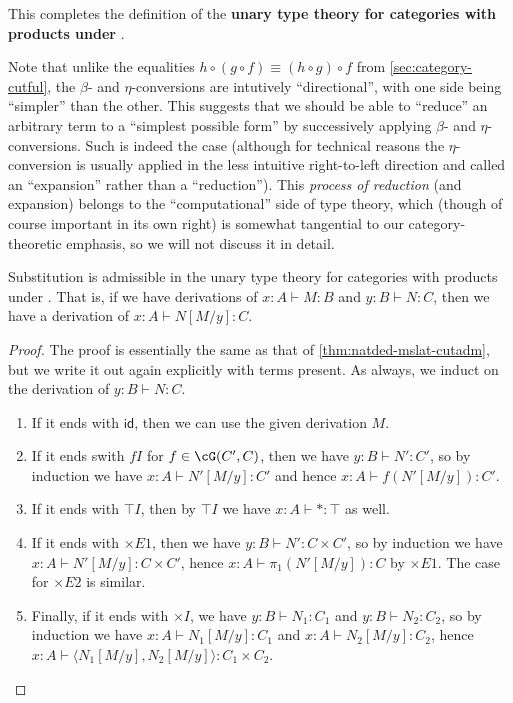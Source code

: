 \documentclass{book}
\def\idfunc{\mathsf{id}}
\let\types\vdash
\def\unit{\top}%
\def\ttt{\mathord{\ast}}%
\def\timesE{\ensuremath{\mathord{\times}E}}
\def\timesI{\ensuremath{\mathord{\times}I}}
\def\pair#1#2{\langle #1,#2\rangle}
\begin{document}
This completes the definition of the \textbf{unary type theory for categories with products under \cG}.

\begin{rmk}\label{rmk:beta-reduction}
  Note that unlike the equalities $h\circ (g\circ f) \equiv (h\circ g)\circ f$ from \cref{sec:category-cutful}, the $\beta$- and $\eta$-conversions are intutively ``directional'', with one side being ``simpler'' than the other.
  This suggests that we should be able to ``reduce'' an arbitrary term to a ``simplest possible form'' by successively applying $\beta$- and $\eta$-conversions.
  Such is indeed the case (although for technical reasons the $\eta$-conversion is usually applied in the less intuitive right-to-left direction and called an ``expansion'' rather than a ``reduction'').
  This \emph{process of reduction} (and expansion) belongs to the ``computational'' side of type theory, which (though of course important in its own right) is somewhat tangential to our category-theoretic emphasis, so we will not discuss it in detail.
\end{rmk}

\begin{thm}\label{thm:catprod-subadm}
  Substitution is admissible in the unary type theory for categories with products under \cG.
  That is, if we have derivations of $x:A\types M:B$ and $y:B \types N:C$, then we have a derivation of $x:A \types N[M/y]:C$.
\end{thm}
\begin{proof}
  The proof is essentially the same as that of \cref{thm:natded-mslat-cutadm}, but we write it out again explicitly with terms present.
  As always, we induct on the derivation of $y:B \types N:C$.
  \begin{enumerate}
  \item If it ends with $\idfunc$, then we can use the given derivation $M$.
  \item If it ends swith $fI$ for $f\in \cG(C',C)$, then we have $y:B \types N':C'$, so by induction we have $x:A\types N'[M/y]:C'$ and hence $x:A\types f(N'[M/y]):C'$.
  \item If it ends with $\unit I$, then by $\unit I$ we have $x:A \types \ttt:\unit$ as well.
  \item If it ends with $\timesE1$, then we have $y:B\types N':C\times C'$, so by induction we have $x:A \types N'[M/y]:C\times C'$, hence $x:A \types \pi_1(N'[M/y]):C$ by $\timesE1$.
    The case for $\timesE2$ is similar.
  \item Finally, if it ends with $\timesI$, we have $y:B\types N_1:C_1$ and $y:B\types N_2:C_2$, so by induction we have $x:A \types N_1[M/y]:C_1$ and $x:A \types N_2[M/y]:C_2$, hence $x:A \types \pair{N_1[M/y]}{N_2[M/y]}:C_1\times C_2$.\qedhere
  \end{enumerate}
\end{proof}
\end{document}
